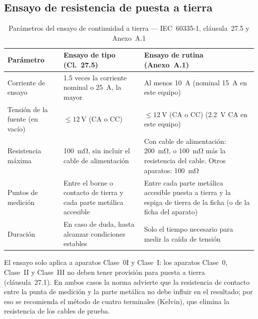 \subsection{Ensayo de resistencia de puesta a tierra}
\label{subsec:tabla_tierra}

\begin{table}[H]
\centering
\caption{Parámetros del ensayo de continuidad a tierra --- IEC~60335-1, cláusula~27.5 y Anexo~A.1}
\label{tab:tierra_referencia}
\renewcommand{\arraystretch}{1.35}
\begin{tabular}{@{} p{3.4cm} p{4.4cm} p{4.4cm} @{}}
\toprule
\textbf{Parámetro}
    & \textbf{Ensayo de tipo (Cl.~27.5)}
    & \textbf{Ensayo de rutina (Anexo~A.1)} \\
\midrule
Corriente de ensayo
    & \num{1.5} veces la corriente nominal o \SI{25}{\ampere}, la mayor
    & Al menos \SI{10}{\ampere}
      (nominal \SI{15}{\ampere} en este equipo) \\
\addlinespace
Tensión de la fuente (en vacío)
    & $\leq \SI{12}{\volt}$ (CA o CC)
    & $\leq \SI{12}{\volt}$ (CA o CC)
      (\SI{2.2}{\volt} CA en este equipo) \\
\addlinespace
Resistencia máxima
    & \SI{100}{\milli\ohm}, sin incluir el cable de alimentación
    & Con cable de alimentación: \SI{200}{\milli\ohm}, o
      \SI{100}{\milli\ohm} más la resistencia del cable. \newline
      Otros aparatos: \SI{100}{\milli\ohm} \\
\addlinespace
Puntos de medición
    & Entre el borne o contacto de tierra y cada parte metálica accesible
    & Entre cada parte metálica accesible puesta a tierra y la
      espiga de tierra de la ficha (o de la ficha del aparato) \\
\addlinespace
Duración
    & En caso de duda, hasta alcanzar condiciones estables
    & Solo el tiempo necesario para medir la caída de tensión \\
\bottomrule
\end{tabular}
\end{table}

\noindent El ensayo solo aplica a aparatos Clase~0I y Clase~I: los aparatos
Clase~0, Clase~II y Clase~III no deben tener provisión para puesta a tierra
(cláusula~27.1).
En ambos casos la norma advierte que la resistencia de contacto entre la
punta de medición y la parte metálica no debe influir en el resultado;
por eso se recomienda el método de cuatro terminales (Kelvin), que elimina
la resistencia de los cables de prueba.

